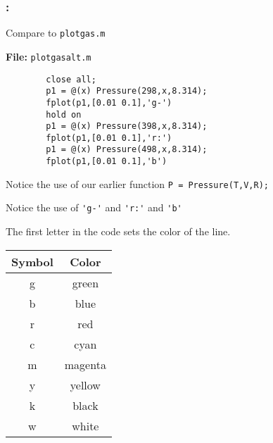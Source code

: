 \documentclass[11pt]{beamer}
\begin{document}
\begin{frame}[fragile]
	
	\frametitle{\secname : \subsecname}
	\vspace{-17pt}
	\begin{minipage}[t]{0.53\linewidth}
		\begin{block}{}
		Compare to \verb|plotgas.m|
		\end{block}	
		\textbf{File:} \verb|plotgasalt.m|
		\begin{verbatim}
		close all;
		p1 = @(x) Pressure(298,x,8.314);
		fplot(p1,[0.01 0.1],'g-')
		hold on
		p1 = @(x) Pressure(398,x,8.314);
		fplot(p1,[0.01 0.1],'r:')
		p1 = @(x) Pressure(498,x,8.314);
		fplot(p1,[0.01 0.1],'b')
		\end{verbatim}
	\begin{exampleblock}{}
	Notice the use of our earlier function
	\verb|P = Pressure(T,V,R);|
	\end{exampleblock}			
	\end{minipage}
	\hspace{7pt}
	\begin{minipage}[t]{0.43\linewidth}
	\begin{block}{}
	Notice the use of
	\verb|'g-'| and \verb|'r:'| and \verb|'b'| 
	\end{block}

	The first letter in the code sets the color of the line.
	\vspace{10pt}
	
	\centering
	\begin{tabular}{c c}
	\hline
	Symbol & Color \\ \hline
		g & green \\
		b & blue \\
		r & red \\
		c & cyan \\
		m & magenta \\
		y & yellow \\
		k & black \\
		w & white\\ 
	\end{tabular} 		
	\end{minipage}
	
\end{frame}
\end{document}
